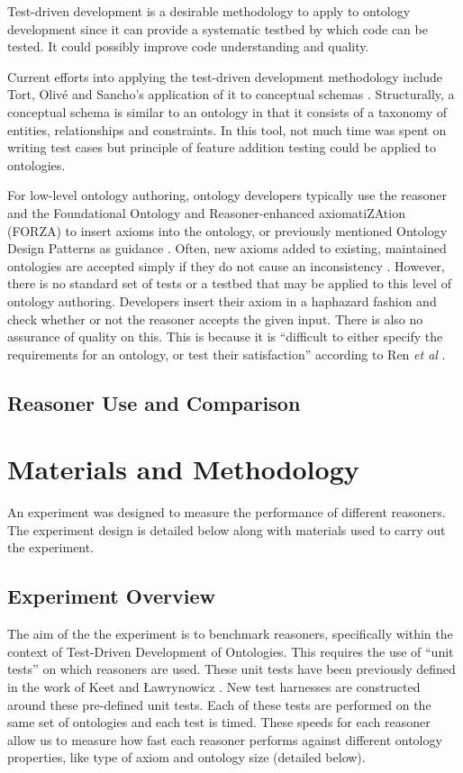 \documentclass[draft]{sig-alternate-05-2015}
\newcommand{\todo}[1][]{\ifdraft{\ifthenelse{\isempty{#1}}{\hl{(TODO)}}{\hl{(TODO: #1)}}}{}}
\begin{document}
Test-driven development is a desirable methodology to apply to ontology development since it can provide a systematic testbed by which code can be tested. It could possibly improve code understanding and quality.

Current efforts into applying the test-driven development methodology include Tort, Oliv\'{e} and Sancho's application of it to conceptual schemas \cite{DBLP:journals/dke/TortOS11}. Structurally, a conceptual schema is similar to an ontology in that it consists of a taxonomy of entities, relationships and constraints. In this tool, not much time was spent on writing test cases but principle of feature addition testing could be applied to ontologies.

For low-level ontology authoring, ontology developers typically use the reasoner and the Foundational Ontology and Reasoner-enhanced axiomatiZAtion (FORZA) to insert axioms into the ontology, or previously mentioned Ontology Design Patterns as guidance \cite{DBLP:conf/esws/KeetL16}. Often, new axioms added to existing, maintained ontologies are accepted simply if they do not cause an inconsistency \cite{DBLP:journals/ws/NikitinaRG12}. However, there is no standard set of tests or a testbed that may be applied to this level of ontology authoring. Developers insert their axiom in a haphazard fashion and check whether or not the reasoner accepts the given input. There is also no assurance of quality on this. This is because it is ``difficult to either specify the requirements for an ontology, or test their satisfaction'' according to Ren \textit{et al} \cite{DBLP:conf/esws/RenPMPDS14}.

\subsection{Reasoner Use and Comparison}

\todo

\section{Materials and Methodology}

An experiment was designed to measure the performance of different reasoners. The experiment design is detailed below along with materials used to carry out the experiment.

\subsection{Experiment Overview}
The aim of the the experiment is to benchmark reasoners, specifically within the context of Test-Driven Development of Ontologies. This requires the use of ``unit tests'' on which reasoners are used. These unit tests have been previously defined in the work of Keet and \L{}awrynowicz \cite{DBLP:conf/esws/KeetL16}. New test harnesses are constructed around these pre-defined unit tests. Each of these tests are performed on the same set of ontologies and each test is timed. These speeds for each reasoner allow us to measure how fast each reasoner performs against different ontology properties, like type of axiom and ontology size (detailed below).
\end{document}
